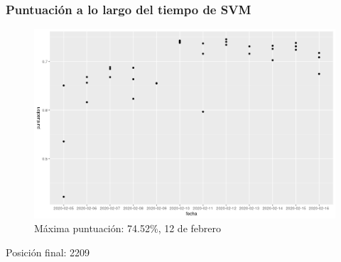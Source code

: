 \begin{frame}
\frametitle{Puntuación a lo largo del tiempo de SVM}

\begin{figure}
	\centering
	\includegraphics[width=\linewidth]{figures/puntuacionSVM}
	\caption{Máxima puntuación: 74.52\%,  12 de febrero}
	\label{fig:puntuacionsvm}
\end{figure}
Posición final: 2209


\end{frame}
